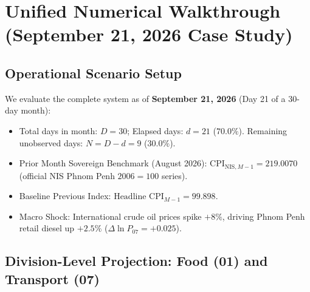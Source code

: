 \documentclass[a4paper, 11pt]{article}
\begin{document}
\section{Unified Numerical Walkthrough (September 21, 2026 Case Study)}

\subsection{Operational Scenario Setup}
We evaluate the complete system as of \textbf{September 21, 2026} (Day 21 of a 30-day month):
\begin{itemize}[noitemsep]
    \item Total days in month: $D = 30$; Elapsed days: $d = 21$ ($70.0\%$). Remaining unobserved days: $N = D - d = 9$ ($30.0\%$).
    \item Prior Month Sovereign Benchmark (August 2026): $\text{CPI}_{\text{NIS}, M-1} = 219.0070$ (official NIS Phnom Penh $2006=100$ series).
    \item Baseline Previous Index: $\text{Headline CPI}_{M-1} = 99.898$.
    \item Macro Shock: International crude oil prices spike $+8\%$, driving Phnom Penh retail diesel up $+2.5\%$ ($\Delta \ln P_{07} = +0.025$).
\end{itemize}

\subsection{Division-Level Projection: Food (01) and Transport (07)}
\end{document}
